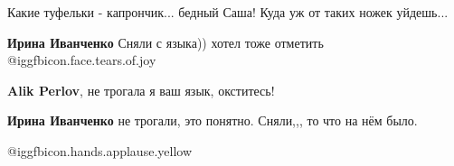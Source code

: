  
 
 
 
 

Какие туфельки - капрончик... бедный Саша! Куда уж от таких ножек уйдешь...

\textbf{Ирина Иванченко} Сняли с языка)) хотел тоже отметить @igg{fbicon.face.tears.of.joy} 

\textbf{Alik Perlov}, не трогала я ваш язык, окститесь!

\textbf{Ирина Иванченко} не трогали, это понятно. Сняли,,, то что на нём было.

 @igg{fbicon.hands.applause.yellow} 
